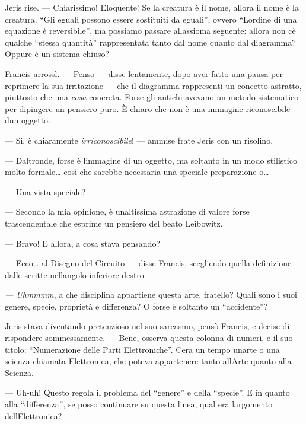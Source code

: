 Jeris rise. --- Chiarissimo! Eloquente! Se la creatura è il nome, allora
il nome è la creatura. ``Gli eguali possono essere sostituiti da
eguali'', ovvero ``L\textquotesingle ordine di una equazione è
reversibile'', ma possiamo passare all\textquotesingle assioma seguente:
allora non c\textquotesingle è qualche ``stessa quantità'' rappresentata
tanto dal nome quanto dal diagramma? Oppure è un sistema chiuso?

Francis arrossì. --- Penso --- disse lentamente, dopo aver fatto una
pausa per reprimere la sua irritazione --- che il diagramma rappresenti
un concetto astratto, piuttosto che una \emph{cosa} concreta. Forse gli
antichi avevano un metodo sistematico per dipingere un pensiero puro. È
chiaro che non è una immagine riconoscibile d\textquotesingle un
oggetto.

--- Si, è chiaramente \emph{irriconoscibile}! --- ammise frate Jeris con
un risolino.

--- D\textquotesingle altronde, forse è l\textquotesingle immagine di un
oggetto, ma soltanto in un modo stilistico molto formale\ldots{} così
che sarebbe necessaria una speciale preparazione o\ldots{}

--- Una vista speciale?

--- Secondo la mia opinione, è un\textquotesingle altissima astrazione
di valore forse trascendentale che esprime un pensiero del beato
Leibowitz.

--- Bravo! E allora, a cosa stava pensando?

--- Ecco\ldots{} al Disegno del Circuito --- disse Francis, scegliendo
quella definizione dalle scritte nell\textquotesingle angolo inferiore
destro.

\emph{--- Uhmmmm}, a che disciplina appartiene questa arte, fratello?
Quali sono i suoi genere, specie, proprietà e differenza? O forse è
soltanto un ``accidente''?

Jeris stava diventando pretenzioso nel suo sarcasmo, pensò Francis, e
decise di rispondere sommessamente. --- Bene, osserva questa colonna di
numeri, e il suo titolo: ``Numerazione delle Parti Elettroniche''.
C\textquotesingle era un tempo un\textquotesingle arte o una scienza
chiamata Elettronica, che poteva appartenere tanto
all\textquotesingle Arte quanto alla Scienza.

--- Uh-uh! Questo regola il problema del ``genere'' e della ``specie''.
E in quanto alla ``differenza'', se posso continuare su questa linea,
qual era l\textquotesingle argomento dell\textquotesingle Elettronica?

